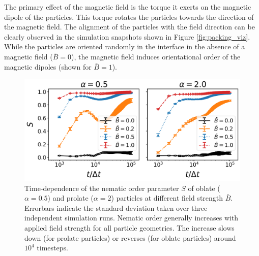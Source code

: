 The primary effect of the magnetic field is the torque it exerts on the
magnetic dipole of the particles. This torque rotates the particles
towards the direction of the magnetic field. The alignment of the
particles with the field direction can be clearly observed in the
simulation snapshots shown in Figure \ref{fig:packing_viz}. While the
particles are oriented randomly in the interface in the absence of a
magnetic field (\(\bar{B}=0\)), the magnetic field induces orientational
order of the magnetic dipoles (shown for \(\bar{B}=1\)).

\begin{figure}
\centering
\includegraphics[scale = 0.4]{figures/results/paper1/S-vs-t.png}
\caption{Time-dependence of the nematic order parameter $S$ of oblate ($\alpha=0.5$) and prolate ($\alpha=2$) 
        particles at different field strength $\bar{B}$. Errorbars indicate the standard deviation taken over 
        three independent simulation runs. Nematic order generally increases with applied field strength for all particle geometries. 
        The increase slows down (for prolate particles) or reverses (for oblate particles) around $10^4$ timesteps.}
\label{fig:nematic_time}
\end{figure}

